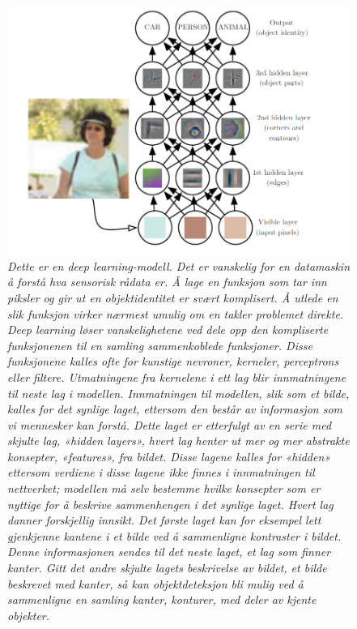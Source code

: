 \begin{figure} 
\begin{center} 
\includegraphics[scale=0.65]{figures/deep}
\caption{\small \sl Dette er en deep learning-modell. Det er vanskelig for en datamaskin å forstå hva sensorisk rådata er. Å lage en funksjon som tar inn piksler og gir ut en objektidentitet er svært komplisert. Å utlede en slik funksjon virker nærmest umulig om en takler problemet direkte. Deep learning løser vanskelighetene ved dele opp den kompliserte funksjonenen til en samling sammenkoblede funksjoner. Disse funksjonene kalles ofte for kunstige nevroner, kerneler, perceptrons eller filtere. Utmatningene fra kernelene i ett lag blir innmatningene til neste lag i modellen. Innmatningen til modellen, slik som et bilde, kalles for det synlige laget, ettersom den består av informasjon som vi mennesker kan forstå. Dette laget er etterfulgt av en serie med skjulte lag, «hidden layers», hvert lag henter ut mer og mer abstrakte konsepter, «features», fra bildet. Disse lagene kalles for «hidden» ettersom verdiene i disse lagene ikke finnes i innmatningen til nettverket; modellen må selv bestemme hvilke konsepter som er nyttige for å beskrive sammenhengen i det synlige laget. Hvert lag danner forskjellig innsikt. Det første laget kan for eksempel lett gjenkjenne kantene i et bilde ved å sammenligne kontraster i bildet. Denne informasjonen sendes til det neste laget, et lag som finner kanter. Gitt det andre skjulte lagets beskrivelse av bildet, et bilde beskrevet med kanter, så kan objektdeteksjon bli mulig ved å sammenligne en samling kanter, konturer, med deler av kjente objekter. \cite{Goodfellow m.fl. 2016 s. 6} \label{fig:deep}} 
\end{center} 
\end{figure} 

